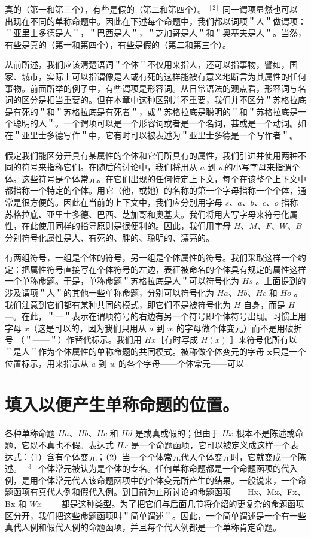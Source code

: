 真的（第一和第三个），有些是假的（第二和第四个）。 ${ }^{[2]}$ 同一谓项显然也可以出现在不同的单称命题中。因此在下述每个命题中，我们都以词项＂人＂做谓项：＂亚里士多德是人＂，＂巴西是人＂，＂芝加哥是人＂和＂奥基夫是人＂。当然，有些是真的（第一和第四个），有些是假的（第二和第三个）。

从前所述，我们应该清楚语词＂个体＂不仅用来指人，还可以指事物，譬如，国家、城市，实际上可以指谓像是人或有死的这样能被有意义地断言为其属性的任何事物。前面所举的例子中，有些谓项是形容词。从日常语法的观点看，形容词与名词的区分是相当重要的。但在本章中这种区别并不重要，我们并不区分＂苏格拉底是有死的＂和＂苏格拉底是有死者＂，或＂苏格拉底是聪明的＂和＂苏格拉底是一个聪明的人＂。一个谓项可以是一个形容词或者是一个名词，甚或是一个动词。如在＂亚里士多德写作＂中，它有时可以被表述为＂亚里士多德是一个写作者＂。

假定我们能区分开具有某属性的个体和它们所具有的属性，我们引进并使用两种不同的符号来指称它们。在随后的讨论中，我们将用从 $a$ 到 $w$的小写字母来指谓个体。这些符号是个体常元。在它们出现的任何特定上下文，每个在该整个上下文中都指称一个特定的个体。用它（他，或她）的名称的第一个字母指称一个个体，通常是很方便的。因此在当前的上下文中，我们应分别用字母 $s 、 a 、 b 、 c 、 o$ 指称苏格拉底、亚里士多德、巴西、芝加哥和奥基夫。我们将用大写字母来符号化属性，在此使用同样的指导原则是很便利的。因此，我们用字母 $H 、 M 、 F 、 W 、 B$ 分别符号化属性是人、有死的、胖的、聪明的、漂亮的。

有两组符号，一组是个体的符号，另一组是个体属性的符号。我们采取这样一个约定：把属性符号直接写在个体符号的左边，表征被命名的个体具有规定的属性这样一个单称命题。于是，单称命题＂苏格拉底是人＂可以符号化为 $H s$ 。上面提到的涉及谓项＂人＂的其他一些单称命题，分别可以符号化为 $H a 、 H b 、 H c$ 和 $H o$ 。我们注意到它们都有某种共同的模式，即它们不是被符号化为 $H$ 自身，而是 $H$ —。在此，＂一＂表示在谓项符号的右边有另一个符号即个体符号出现。习惯上用字母 $x$（这是可以的，因为我们只用从 $a$ 到 $w$ 的字母做个体变元）而不是用破折号 （＂——＂）作替代标示。我们用 $H x$［有时写成 $H(x)$ ］来符号化所有以 ＂是人＂作为个体属性的单称命题的共同模式。被称做个体变元的字母 $\boldsymbol{x}$只是一个位置标示，用来指示从 $a$ 到 $w$ 的各个字母——个体常元——可以

\section*{填入以便产生单称命题的位置。}
各种单称命题 $H a 、 H b 、 H c$ 和 $H d$ 是或真或假的；但由于 $H x$ 根本不是陈述或命题，它既不真也不假。表达式 $H x$ 是一个命题函项，它可以被定义成这样一个表达式：（1）含有个体变元；（2）当一个个体常元代入个体变元时，它就变成一个陈述。 ${ }^{[3]}$ 个体常元被认为是个体的专名。任何单称命题都是一个命题函项的代入例，是用个体常元代人该命题函项中的个体变元所产生的结果。一般说来，一个命题函项有真代人例和假代入例。到目前为止所讨论的命题函项——Hx、Mx、Fx、Bx 和 $W x$ ——都是这种类型。为了把它们与后面几节将介绍的更复杂的命题函项区分开，我们把这些命题函项叫＂简单谓述＂。因此，一个简单谓述是一个有一些真代人例和假代人例的命题函项，并且每个代人例都是一个单称肯定命题。

